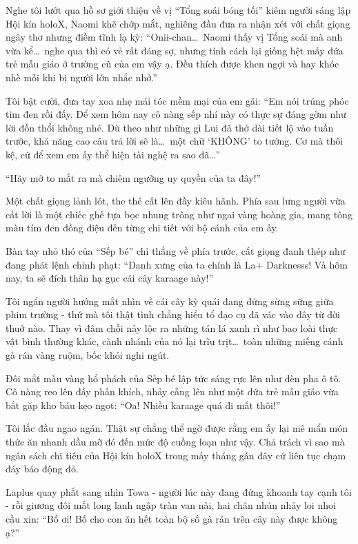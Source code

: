 \documentclass[../main.tex]{subfiles}
\begin{document}
Nghe tôi lướt qua hồ sơ giới thiệu về vị ``Tổng soái bóng tối'' kiêm người sáng lập Hội kín holoX, Naomi khẽ chớp mắt, nghiêng đầu đưa ra nhận xét với chất giọng ngây thơ nhưng điềm tĩnh lạ kỳ: ``Onii-chan\dots\ Naomi thấy vị Tổng soái mà anh vừa kể\dots\ nghe qua thì có vẻ rất đáng sợ, nhưng tính cách lại giống hệt mấy đứa trẻ mẫu giáo ở trường cũ của em vậy ạ. Đều thích được khen ngợi và hay khóc nhè mỗi khi bị người lớn nhắc nhở.''

Tôi bật cười, đưa tay xoa nhẹ mái tóc mềm mại của em gái: ``Em nói trúng phóc tim đen rồi đấy. Để xem hôm nay cô nàng sếp nhí này có thực sự đáng gờm như lời đồn thổi không nhé. Dù theo như những gì Lui đã thở dài tiết lộ vào tuần trước, khả năng cao câu trả lời sẽ là\dots\ một chữ `KHÔNG' to tướng. Cơ mà thôi kệ, cứ để xem em ấy thể hiện tài nghệ ra sao đã\dots''

\il

``Hãy mở to mắt ra mà chiêm ngưỡng uy quyền của ta đây!''

Một chất giọng lảnh lót, the thé cất lên đầy kiêu hãnh. Phía sau lưng người vừa cất lời là một chiếc ghế tựa bọc nhung trông như ngai vàng hoàng gia, mang tông màu tím đen đồng điệu đến từng chi tiết với bộ cánh của em ấy.

Bàn tay nhỏ thó của ``Sếp bé'' chỉ thẳng về phía trước, cất giọng đanh thép như đang phát lệnh chinh phạt: ``Danh xưng của ta chính là La+ Darknesss! Và hôm nay, ta sẽ đích thân hạ gục cái cây karaage này!''

Tôi ngẩn người hướng mắt nhìn về cái cây kỳ quái đang đứng sừng sững giữa phim trường - thứ mà tôi thật tình chẳng hiểu tổ đạo cụ đã vác vào đây từ đời thuở nào. Thay vì đâm chồi nảy lộc ra những tán lá xanh rì như bao loài thực vật bình thường khác, cành nhánh của nó lại trĩu trịt\dots\ toàn những miếng cánh gà rán vàng ruộm, bốc khói nghi ngút.

Đôi mắt màu vàng hổ phách của Sếp bé lập tức sáng rực lên như đèn pha ô tô. Cô nàng reo lên đầy phấn khích, nhảy cẫng lên như một đứa trẻ mẫu giáo vừa bắt gặp kho báu kẹo ngọt: ``Oa! Nhiều karaage quá đi mất thôi!''


Tôi lắc đầu ngao ngán. Thật sự chẳng thể ngờ được rằng em ấy lại mê mẩn món thức ăn nhanh dầu mỡ đó đến mức độ cuồng loạn như vậy. Chả trách vì sao mà ngân sách chi tiêu của Hội kín holoX trong mấy tháng gần đây cứ liên tục chạm đáy báo động đỏ.

Laplus quay phắt sang nhìn Towa - người lúc này đang đứng khoanh tay cạnh tôi - rồi giương đôi mắt long lanh ngập tràn van nài, hai chân nhún nhảy loi nhoi cầu xin: ``Bố ơi! Bố cho con ăn hết toàn bộ số gà rán trên cây này được không ạ?''
\end{document}
